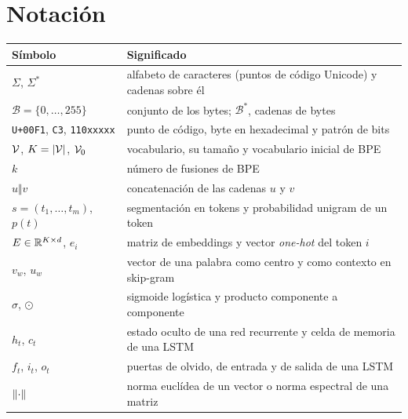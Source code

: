 \documentclass[11pt,a4paper,twoside,openany]{book}
\newcommand{\hx}[1]{\texttt{#1}}
\newcommand{\bits}[1]{\texttt{#1}}
\begin{document}
\section*{Notación}
\begin{center}\small
\begin{tabularx}{\textwidth}{@{}l>{\raggedright\arraybackslash}X@{}}
\toprule
Símbolo & Significado \\
\midrule
$\Sigma$, $\Sigma^{*}$ & alfabeto de caracteres (puntos de código Unicode) y cadenas sobre él \\
$\mathcal{B}=\{0,\dots,255\}$ & conjunto de los bytes; $\mathcal{B}^{*}$, cadenas de bytes \\
\hx{U+00F1}, \hx{C3}, \bits{110xxxxx} & punto de código, byte en hexadecimal y patrón de bits \\
$\mathcal{V}$, $K=\lvert\mathcal{V}\rvert$, $\mathcal{V}_0$ & vocabulario, su tamaño y vocabulario inicial de BPE \\
$k$ & número de fusiones de BPE \\
$u\Vert v$ & concatenación de las cadenas $u$ y $v$ \\
$s=(t_1,\dots,t_m)$, $p(t)$ & segmentación en tokens y probabilidad unigram de un token \\
$E\in\mathbb{R}^{K\times d}$, $e_i$ & matriz de embeddings y vector \emph{one-hot} del token $i$ \\
$v_w$, $u_w$ & vector de una palabra como centro y como contexto en skip-gram \\
$\sigma$, $\odot$ & sigmoide logística y producto componente a componente \\
$h_t$, $c_t$ & estado oculto de una red recurrente y celda de memoria de una LSTM \\
$f_t$, $i_t$, $o_t$ & puertas de olvido, de entrada y de salida de una LSTM \\
$\lVert\cdot\rVert$ & norma euclídea de un vector o norma espectral de una matriz \\
\bottomrule
\end{tabularx}
\end{center}


\tableofcontents

\mainmatter






\backmatter

\end{document}
